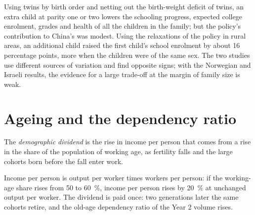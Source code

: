 \begin{record}
Using twins by birth order and netting out the birth-weight deficit of twins, an
extra child at parity one or two lowers the schooling progress, expected college
enrolment, grades and health of all the children in the family; but the policy's
contribution to China's  was modest. %
Using the relaxations of the policy in rural areas, an additional child raised the
first child's school enrolment by about 16 percentage points, more when the children were of the same sex. %
The two studies use different sources of variation and find opposite signs; with
the Norwegian and Israeli results, the evidence for a large trade-off at the margin
of family size is weak.
\end{record}

\section{Ageing and the dependency ratio}\label{sec:b3:demographic-transition:ageing}

\begin{definition}\label{def:b3:demographic-transition:dividend}
The \emph{demographic dividend} is the rise in income per person that comes from a
rise in the share of the population of working age, as fertility falls and the
large cohorts born before the fall enter work.
\end{definition}

Income per person is output per worker times workers per person: if the working-age
share rises from 50 to 60~\%, income per person rises by 20~\% at unchanged output per worker. The dividend is
paid once: two generations later the same cohorts retire, and the old-age dependency
ratio of the Year 2 volume rises.

